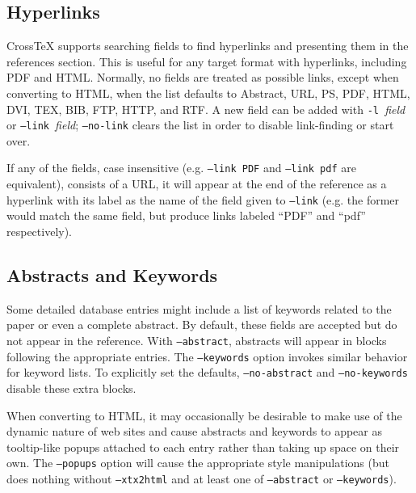 \documentclass{article}
\newcommand{\XTX}{Cross\TeX}
\begin{document}
\subsection{Hyperlinks}

\XTX{} supports searching fields to find hyperlinks and presenting them
in the references section.  This is useful for any target format with
hyperlinks, including PDF and HTML.  Normally, no fields are treated
as possible links, except when converting to HTML, when the list
defaults to Abstract, URL, PS, PDF, HTML, DVI, TEX, BIB, FTP, HTTP,
and RTF.  A new field can be added with \texttt{-l~}\textit{field} or
\texttt{--link~}\textit{field}; \texttt{--no-link} clears the list in
order to disable link-finding or start over.

If any of the fields, case insensitive (e.g. \texttt{--link~PDF} and
\texttt{--link~pdf} are equivalent), consists of a URL, it will appear
at the end of the reference as a hyperlink with its label as the name
of the field given to \texttt{--link} (e.g. the former would match the
same field, but produce links labeled ``PDF'' and ``pdf'' respectively).

\subsection{Abstracts and Keywords}

Some detailed database entries might include a list of keywords related
to the paper or even a complete abstract.  By default, these fields are
accepted but do not appear in the reference.  With \texttt{--abstract},
abstracts will appear in blocks following the appropriate entries.
The \texttt{--keywords} option invokes similar behavior for keyword
lists.  To explicitly set the defaults, \texttt{--no-abstract} and
\texttt{--no-keywords} disable these extra blocks.


When converting to HTML, it may occasionally be desirable to make use of
the dynamic nature of web sites and cause abstracts and keywords to appear
as tooltip-like popups attached to each entry rather than taking up space
on their own.  The \texttt{--popups} option will cause the appropriate
style manipulations (but does nothing without \texttt{--xtx2html} and
at least one of \texttt{--abstract} or \texttt{--keywords}).
\end{document}
